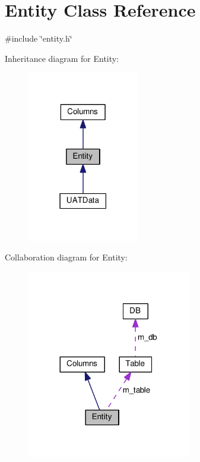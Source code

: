 \hypertarget{classEntity}{}\section{Entity Class Reference}
\label{classEntity}


{\ttfamily \#include \char`\"{}entity.\+h\char`\"{}}



Inheritance diagram for Entity\+:\nopagebreak
\begin{figure}[H]
\begin{center}
\leavevmode
\includegraphics[width=138pt]{classEntity__inherit__graph}
\end{center}
\end{figure}


Collaboration diagram for Entity\+:\nopagebreak
\begin{figure}[H]
\begin{center}
\leavevmode
\includegraphics[width=203pt]{classEntity__coll__graph}
\end{center}
\end{figure}
